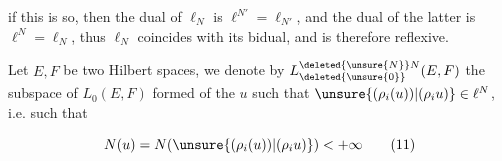 \margin{\textcolor{red}{?}}

 if this is so, then the dual of $\ell_N$ is $\ell^{N'}=\ell_{N'}$, and the dual of the latter is $\ell^N=\ell_N$, thus $\ell_N$ coincides with its bidual, and is therefore reflexive.

 Let $E,F$ be two Hilbert spaces,  we denote by $L^{\deleted{\unsure{N}}N}_{\deleted{\unsure{0}}}(E,F)$ the  subspace of $L_0(E,F)$ formed of the $u$ such that $\unsure{(\rho_i(u))|(\rho_i u)}\in\ell^N$, i.e. such that

\[
N(u)=N(\unsure{(\rho_i(u))|(\rho_i u)})<+\infty\tag*{(11)}
\]

